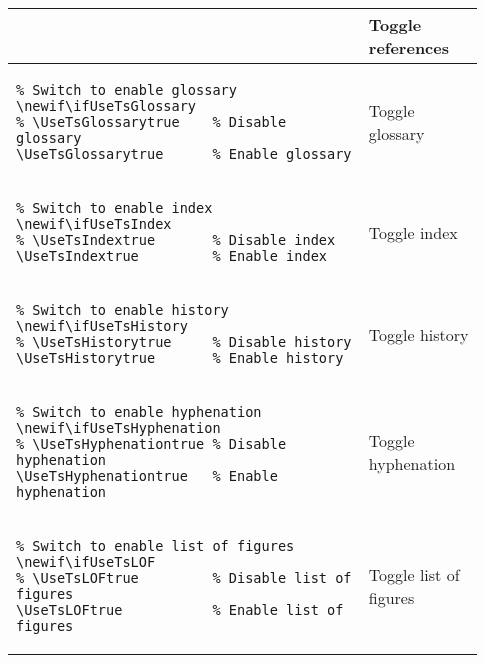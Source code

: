 \begin{footnotesize}
\begin{longtable}{ | P{0.7\linewidth} | p{0.23\linewidth} | }
         & Toggle references                                                    \\
        \hline
        \begin{BVerbatim}
\newif\ifUseTsGlossary
\UseTsGlossarytrue      %
        \end{BVerbatim}
         & Toggle glossary                                                      \\
        \hline
        \begin{BVerbatim}
\newif\ifUseTsIndex
\UseTsIndextrue         %
        \end{BVerbatim}
         & Toggle index                                                         \\
        \hline
        \begin{BVerbatim}
\newif\ifUseTsHistory
\UseTsHistorytrue       %
        \end{BVerbatim}
         & Toggle history                                                       \\
        \hline
        \begin{BVerbatim}
\newif\ifUseTsHyphenation
\UseTsHyphenationtrue   %
        \end{BVerbatim}
         & Toggle \newline hyphenation                                          \\
        \hline
        \begin{BVerbatim}
\newif\ifUseTsLOF
\UseTsLOFtrue           %
        \end{BVerbatim}
         & Toggle list \newline of figures                                      \\

\end{longtable}
\end{footnotesize}
